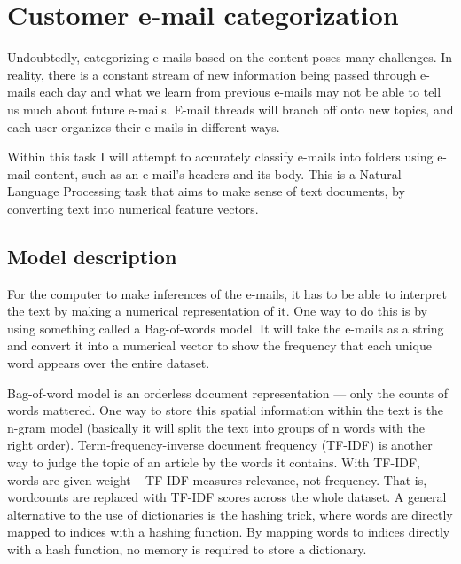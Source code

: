 \documentclass[11pt,fleqn]{book} %
\begin{document}
\chapter{Customer e-mail categorization}

Undoubtedly, categorizing e-mails based on the content poses many challenges. In reality, there is a constant stream of new information being passed through e-mails each day and what we learn from previous e-mails may not be able to tell us much about future e-mails. E-mail threads will branch off onto new topics, and each user organizes their e-mails in different ways. 

Within this task I will attempt to accurately classify e-mails into folders using e-mail content, such as an e-mail's headers and its body. This is a Natural Language Processing task that aims to make sense of text documents, by converting text into numerical feature vectors.

\section{Model description}
For the computer to make inferences of the e-mails, it has to be able to interpret the text by making a numerical representation of it. One way to do this is by using something called a Bag-of-words model. It will take the e-mails as a string and convert it into a numerical vector to show the frequency that each unique word appears over the entire dataset.

Bag-of-word model is an orderless document representation — only the counts of words mattered. One way to store this spatial information within the text is the n-gram model (basically it will split the text into groups of n words with the right order). Term-frequency-inverse document frequency (TF-IDF) is another way to judge the topic of an article by the words it contains. With TF-IDF, words are given weight – TF-IDF measures relevance, not frequency. That is, wordcounts are replaced with TF-IDF scores across the whole dataset. A general alternative to the use of dictionaries is the hashing trick, where words are directly mapped to indices with a hashing function. By mapping words to indices directly with a hash function, no memory is required to store a dictionary. 
\end{document}
